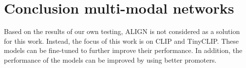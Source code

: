 
\section{Conclusion multi-modal networks}
    Based on the results of our own testing, ALIGN is not considered as a solution for this work.
    Instead, the focus of this work is on CLIP and TinyCLIP.
    These models can be fine-tuned to further improve their performance.
    In addition, the performance of the models can be improved by using better promoters.
